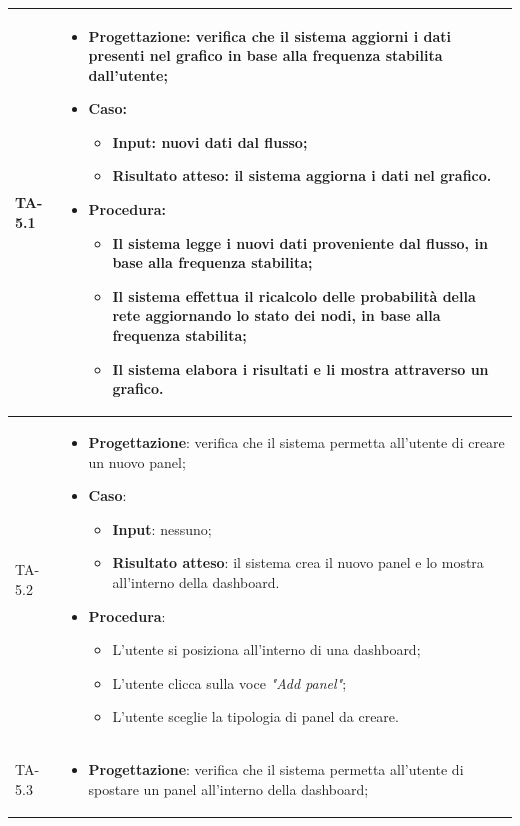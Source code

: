 \begin{longtable}{|C{2.5cm}|C{13cm}|}
{TA-5.1} &
\begin{itemize}
	\item \textbf{Progettazione}: verifica che il sistema aggiorni i dati presenti nel grafico in base alla frequenza stabilita dall'utente;
	\item \textbf{Caso}: 
	\begin{itemize}
		\item \textbf{Input}: nuovi dati dal flusso;
		\item \textbf{Risultato atteso}: il sistema aggiorna i dati nel grafico.
	\end{itemize}
	\item \textbf{Procedura}:
	\begin{itemize}
		\item Il sistema legge i nuovi dati proveniente dal flusso, in base alla frequenza stabilita;
		\item Il sistema effettua il ricalcolo delle probabilità della rete aggiornando lo stato dei nodi, in base alla frequenza stabilita;
		\item Il sistema elabora i risultati e li mostra attraverso un grafico.
	\end{itemize} 
\end{itemize} \\
\hline
{TA-5.2} &
\begin{itemize}
	\item \textbf{Progettazione}: verifica che il sistema permetta all'utente di creare un nuovo panel;
	\item \textbf{Caso}: 
	\begin{itemize}
		\item \textbf{Input}: nessuno;
		\item \textbf{Risultato atteso}: il sistema crea il nuovo panel e lo mostra all'interno della dashboard.
	\end{itemize}
	\item \textbf{Procedura}:
	\begin{itemize}
		\item L'utente si posiziona all'interno di una dashboard;
		\item L'utente clicca sulla voce \emph{"Add panel"};
		\item L'utente sceglie la tipologia di panel da creare.
	\end{itemize} 
\end{itemize} \\
\hline
{TA-5.3} &
\begin{itemize}
	\item \textbf{Progettazione}: verifica che il sistema permetta all'utente di spostare un panel all'interno della dashboard;

\end{itemize}
\end{longtable}
